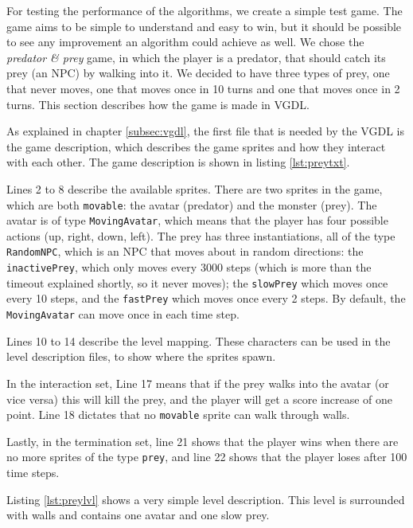

For testing the performance of the algorithms, we create a simple test game. The
game aims to be simple to understand and easy to win, but it should be possible
to see any improvement an algorithm could achieve as well. We chose the
\emph{predator \& prey} game, in which the player is a predator, that should
catch its prey (an NPC) by walking into it. We decided to have three types of
prey, one that never moves, one that moves once in 10 turns and one that moves
once in 2 turns. This section describes how the game is made in VGDL.

As explained in chapter \ref{subsec:vgdl}, the first file that is needed by the
VGDL is the game description, which describes the game sprites and how they
interact with each other. The game description is shown in listing
\ref{lst:preytxt}.

Lines 2 to 8 describe the available sprites. There are two sprites in the game,
which are both \texttt{movable}: the avatar (predator) and the monster (prey).
The avatar is of type \texttt{MovingAvatar}, which means that the player has
four possible actions (up, right, down, left). The prey has three
instantiations, all of the type \texttt{RandomNPC}, which is an NPC that moves
about in random directions: the \texttt{inactivePrey}, which only moves every
3000 steps (which is more than the timeout explained shortly, so it never
moves); the \texttt{slowPrey} which moves once every 10 steps, and the
\texttt{fastPrey} which moves once every 2 steps.  By default, the
\texttt{MovingAvatar} can move once in each time step.

Lines 10 to 14 describe the level mapping. These characters can be used in the
level description files, to show where the sprites spawn. 

In the interaction set, Line 17 means that if the prey walks into the avatar (or
vice versa) this will kill the prey, and the player will get a score increase of
one point. Line 18 dictates that no \texttt{movable} sprite can walk through
walls.

Lastly, in the termination set, line 21 shows that the player wins when there
are no more sprites of the type \texttt{prey}, and line 22 shows that the player
loses after 100 time steps.

Listing \ref{lst:preylvl} shows a very simple level description. This level is
surrounded with walls and contains one avatar and one slow prey. 

